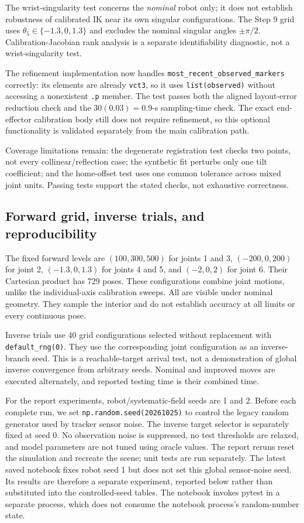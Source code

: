 \documentclass[11pt]{article}
\begin{document}
The wrist-singularity test concerns the \emph{nominal} robot only; it does not establish robustness of calibrated IK near its own singular configurations. The Step 9 grid uses $\theta_5\in\{-1.3,0,1.3\}$ and excludes the nominal singular angles $\pm\pi/2$. Calibration-Jacobian rank analysis is a separate identifiability diagnostic, not a wrist-singularity test.

The refinement implementation now handles \texttt{most\_recent\_observed\_markers} correctly: its elements are already \texttt{vct3}, so it uses \texttt{list(observed)} without accessing a nonexistent \texttt{.p} member. The test passes both the aligned layout-error reduction check and the $30(0.03)=0.9$-s sampling-time check. The exact end-effector calibration body still does not require refinement, so this optional functionality is validated separately from the main calibration path.

Coverage limitations remain: the degenerate registration test checks two points, not every collinear/reflection case; the synthetic fit perturbs only one tilt coefficient; and the home-offset test uses one common tolerance across mixed joint units. Passing tests support the stated checks, not exhaustive correctness.

\subsection{Forward grid, inverse trials, and reproducibility}
The fixed forward levels are $(100,300,500)$ for joints 1 and 3, $(-200,0,200)$ for joint 2, $(-1.3,0,1.3)$ for joints 4 and 5, and $(-2,0,2)$ for joint 6. Their Cartesian product has 729 poses. These configurations combine joint motions, unlike the individual-axis calibration sweeps. All are visible under nominal geometry. They sample the interior and do not establish accuracy at all limits or every continuous pose.

Inverse trials use 40 grid configurations selected without replacement with \texttt{default\_rng(0)}. They use the corresponding joint configuration as an inverse-branch seed. This is a reachable-target arrival test, not a demonstration of global inverse convergence from arbitrary seeds. Nominal and improved moves are executed alternately, and reported testing time is their combined time.

For the report experiments, robot/systematic-field seeds are 1 and 2. Before each complete run, we set \texttt{np.random.seed(20261025)} to control the legacy random generator used by tracker sensor noise. The inverse target selector is separately fixed at seed 0. No observation noise is suppressed, no test thresholds are relaxed, and model parameters are not tuned using oracle values. The report reruns reset the simulation and recreate the scene; unit tests are run separately. The latest saved notebook fixes robot seed 1 but does not set this global sensor-noise seed. Its results are therefore a separate experiment, reported below rather than substituted into the controlled-seed tables. The notebook invokes pytest in a separate process, which does not consume the notebook process's random-number state.
\end{document}
